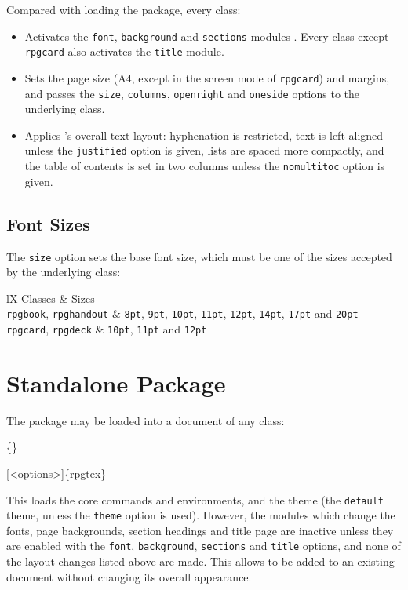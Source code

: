 			Compared with loading the package, every class:
			\begin{itemize}
				\item Activates the \texttt{font}, \texttt{background} and \texttt{sections} modules . Every class except \texttt{rpgcard} also activates the \texttt{title} module.
				\item Sets the page size (A4, except in the screen mode of \texttt{rpgcard}) and margins, and passes the \texttt{size}, \texttt{columns}, \texttt{openright} and \texttt{oneside} options to the underlying class.
				\item Applies \rpgtex{}'s overall text layout: hyphenation is restricted, text is left-aligned unless the \texttt{justified} option is given, lists are spaced more compactly, and the table of contents is set in two columns unless the \texttt{nomultitoc} option is given.
			\end{itemize}

		\subsection{Font Sizes}\label{S:ClassSizes}

			The \texttt{size} option sets the base font size, which must be one of the sizes accepted by the underlying class:
			\begin{RpgTable}{lX}
				Classes & Sizes
				\\
				\texttt{rpgbook}, \texttt{rpghandout} & \texttt{8pt}, \texttt{9pt}, \texttt{10pt}, \texttt{11pt}, \texttt{12pt}, \texttt{14pt}, \texttt{17pt} and \texttt{20pt}
				\\
				\texttt{rpgcard}, \texttt{rpgdeck} & \texttt{10pt}, \texttt{11pt} and \texttt{12pt}
			\end{RpgTable}

	\section{Standalone Package}\label{S:StandalonePackage}

		The package may be loaded into a document of any class:
		\begin{Code}
			\{<any-class>\}

			[<options>]\{rpgtex\}
		\end{Code}
		This loads the core commands and environments, and the theme (the \texttt{default} theme, unless the \texttt{theme} option is used). However, the modules which change the fonts, page backgrounds, section headings and title page are inactive unless they are enabled with the \texttt{font}, \texttt{background}, \texttt{sections} and \texttt{title} options, and none of the layout changes listed above  are made. This allows \rpgtex{} to be added to an existing document without changing its overall appearance.

